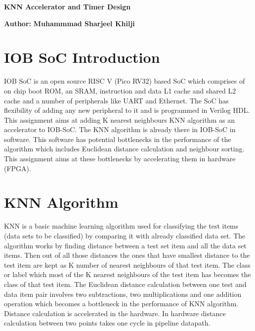\documentclass[12pt]{article}
\begin{document}
\begin{titlepage}
   \begin{center}
       \vspace*{1cm}

       \textbf{KNN Accelerator and Timer Design}

       
            
       \vspace{1.5cm}
	\textbf{Author:}
       \textbf{Muhammmad Sharjeel Khilji}

       \vfill
            
            
   \end{center}
\end{titlepage}
\tableofcontents
\pagebreak
\section{IOB SoC Introduction}
IOB SoC is an open source RISC V (Pico RV32) based SoC which comprises of on chip boot ROM, an SRAM, instruction and data L1 cache and shared L2 cache and a number of peripherals like UART and Ethernet. 
The SoC has flexibility of adding any new peripheral to it and is programmed in Verilog HDL. This assignment aims at adding K nearest neighbours KNN algorithm as an accelerator to IOB-SoC. The KNN algorithm is already there in IOB-SoC in software. This software has potential bottlenecks in the performance of the algorithm which includes Euclidean distance calculation and neighbour sorting. This assignment aims at these bottlenecks by accelerating them in hardware (FPGA).
\section{KNN Algorithm}
KNN is a basic machine learning algorithm used for classifying the test items (data sets to be classified) by comparing it with already classified data set. The algorithm works by finding distance between a test set item and all the data set items. Then out of all those distances the ones that have smallest distance to the test item are kept as K number of nearest neighbours of that test item. The class or label which most of the K nearest neighbours of the test item has becomes the class of that test item.
The Euclidean distance calculation between one test and data item pair involves two subtractions, two multiplications and one addition operation which becomes a bottleneck in the performance of KNN algorithm. Distance calculation is accelerated in the hardware. In hardware distance calculation between two points takes one cycle in pipeline datapath.
\end{document}
